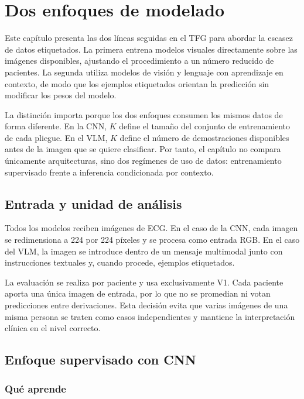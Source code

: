 \chapter{Dos enfoques de modelado}
\label{chap:modelos}

Este capítulo presenta las dos líneas seguidas en el TFG para abordar la escasez de datos etiquetados. La primera entrena modelos visuales directamente sobre las imágenes disponibles, ajustando el procedimiento a un número reducido de pacientes. La segunda utiliza modelos de visión y lenguaje con aprendizaje en contexto, de modo que los ejemplos etiquetados orientan la predicción sin modificar los pesos del modelo.

La distinción importa porque los dos enfoques consumen los mismos datos de forma diferente. En la CNN, \(K\) define el tamaño del conjunto de entrenamiento de cada pliegue. En el VLM, \(K\) define el número de demostraciones disponibles antes de la imagen que se quiere clasificar. Por tanto, el capítulo no compara únicamente arquitecturas, sino dos regímenes de uso de datos: entrenamiento supervisado frente a inferencia condicionada por contexto.

\section{Entrada y unidad de análisis}

Todos los modelos reciben imágenes de ECG. En el caso de la CNN, cada imagen se redimensiona a 224 por 224 píxeles y se procesa como entrada RGB. En el caso del VLM, la imagen se introduce dentro de un mensaje multimodal junto con instrucciones textuales y, cuando procede, ejemplos etiquetados.

La evaluación se realiza por paciente y usa exclusivamente V1. Cada paciente aporta una única imagen de entrada, por lo que no se promedian ni votan predicciones entre derivaciones. Esta decisión evita que varias imágenes de una misma persona se traten como casos independientes y mantiene la interpretación clínica en el nivel correcto.

\section{Enfoque supervisado con CNN}

\subsection{Qué aprende}

